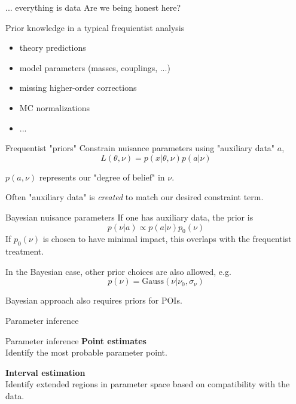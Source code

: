 \documentclass[
aspectratio=169,
14pt,
professionalfonts
]{beamer}
\begin{document}
\begin{frame}{... everything is data}
    {\centering Are we being honest here?}

    Prior knowledge in a typical frequientist analysis
    \begin{itemize}
        \item theory predictions
        \item model parameters (masses, couplings, ...)
        \item missing higher-order corrections
        \item MC normalizations
        \item ...
    \end{itemize}
\end{frame}

\begin{frame}{Frequentist "priors"}
Constrain nuisance parameters using "auxiliary data" $a$,
$$L(\theta, \nu) = p(x| \theta, \nu) p(a| \nu)$$

$p(a, \nu)$ represents our "degree of belief" in $\nu$.

\vspace{0.5cm}

Often "auxiliary data" is \textit{created} to match our desired constraint term.
\end{frame}

\begin{frame}{Bayesian nuisance parameters}
If one has auxiliary data, the prior is
$$p(\nu|a) \propto p(a|\nu) p_0(\nu)$$
If $p_0(\nu)$ is chosen to have minimal impact, this overlaps with the frequentist treatment.

In the Bayesian case, other prior choices are also allowed, e.g.
$$ p(\nu) = \text{Gauss}(\nu | \nu_0, \sigma_\nu)$$

Bayesian approach also requires priors for POIs.
\end{frame}

\begin{frame}
\center
\Large
Parameter inference
\end{frame}

\begin{frame}{Parameter inference}
    \center
    \textbf{Point estimates}\\
    Identify the most probable parameter point.

    \vspace{1cm}

    \textbf{Interval estimation}\\
    Identify extended regions in parameter space based on compatibility with the data.
\end{frame}
\end{document}
